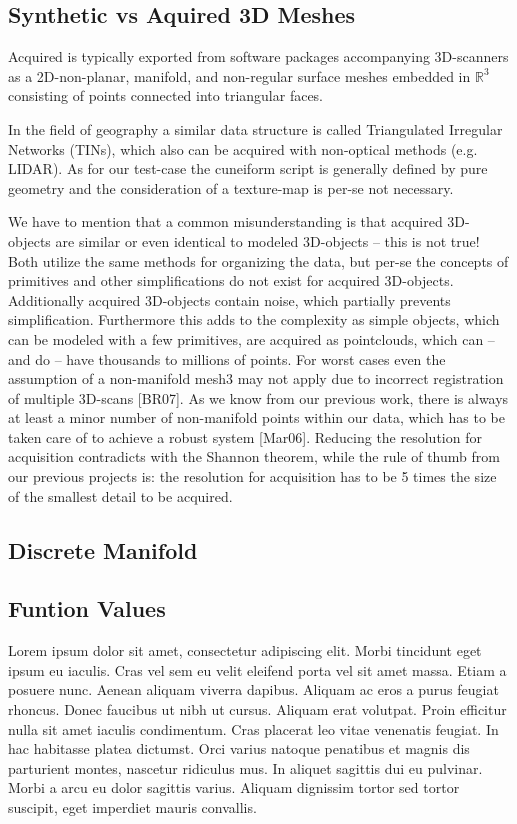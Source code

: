 \subsection{Synthetic vs Aquired 3D Meshes}
\label{chBsSvA}

Acquired \tdd{} is typically exported from software packages accompanying 3D-scanners as a 2D-non-planar, manifold, and non-regular surface meshes embedded in $\mathbb{R}^3$ consisting of points connected into triangular faces.


In the field of geography a similar data structure is called
Triangulated Irregular Networks (TINs), which also can be acquired with
non-optical methods (e.g. LIDAR). As for our test-case the cuneiform script is
generally defined by pure geometry and the consideration of a texture-map is
per-se not necessary.~\cite[p.~25]{Mara12}

We have to mention that a common misunderstanding is that acquired 3D-objects are similar or even identical to modeled 3D-objects – this is not true! Both utilize the same methods for organizing the data, but per-se the concepts of primitives and other simplifications do not exist for acquired 3D-objects. Additionally acquired 3D-objects contain noise, which partially prevents simplification. Furthermore this adds to the complexity as simple objects, which can be modeled with a few primitives, are acquired as pointclouds, which can – and do – have thousands to millions of points. For worst cases even the assumption of a non-manifold mesh3 may not apply due to incorrect registration of multiple 3D-scans [BR07]. As we know from our previous work, there is always at least a minor number of non-manifold points within our data, which has to be taken care of to achieve a robust system [Mar06]. Reducing the resolution for acquisition contradicts with the Shannon theorem, while the rule of thumb from our previous projects is: the resolution for acquisition has to be 5 times the size of the smallest detail to be acquired.~\cite[p.~25]{Mara12}
%
\subsection{Discrete Manifold}
%
\subsection{Funtion Values}
Lorem ipsum dolor sit amet, consectetur adipiscing elit. Morbi tincidunt eget
ipsum eu iaculis. Cras vel sem eu velit eleifend porta vel sit amet massa. Etiam
a posuere nunc. Aenean aliquam viverra dapibus. Aliquam ac eros a purus feugiat
rhoncus. Donec faucibus ut nibh ut cursus. Aliquam erat volutpat. Proin efficitur
nulla sit amet iaculis condimentum. Cras placerat leo vitae venenatis feugiat. In
hac habitasse platea dictumst. Orci varius natoque penatibus et magnis dis
parturient montes, nascetur ridiculus mus. In aliquet sagittis dui eu pulvinar.
Morbi a arcu eu dolor sagittis varius. Aliquam dignissim tortor sed tortor
suscipit, eget imperdiet mauris convallis.~\cite[p.~00]{todoCitation}\todoCitation
%
